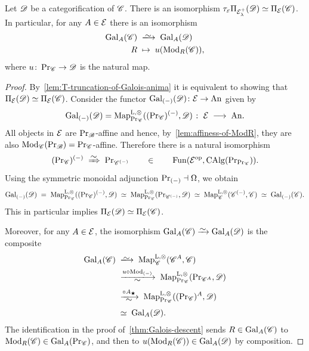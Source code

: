 \documentclass[english,svgnames,table]{article}
\begin{document}
    \begin{proposition}
    \label{prop:piT-and-categorification}
        Let $\cD$ be a categorification of $\cC$.
        There is an isomorphism $\tau_{\scriptscriptstyle\cT}{\piT[\cT^+_{\lambda}]}(\cD) \simeq \piT(\cC)$. In particular, for any $A \in \cT$ there is an isomorphism
        \begin{equation*}
            \begin{split}
                \Gal_A(\cC) & \;\isotoo\; \Gal_A(\cD) \\
                R & \;\mapsto\; u(\Mod_R(\cC)),
            \end{split}
        \end{equation*}
        where $u \colon \ModC \to \cD$ is the natural map.
    \end{proposition}
    \begin{proof}
        By~\cref{lem:T-truncation-of-Galois-anima} it is equivalent to showing that $\piT(\cD) \simeq \piT(\cC)$.
        Consider the functor $\Gal_{(-)}(\cD) \colon \cT \to \An$ given by
        \begin{equation*}
            \Gal_{(-)}(\cD) = \MapCo[\ModC]((\ModC)^{(-)}, \cD) \;\colon\; \cT \;\too\; \An.
        \end{equation*}
        All objects in $\cT$ are $\ModB$-affine and hence, by~\cref{lem:affiness-of-ModR}, they are also $\Mod_{\cC}(\ModB) = \ModC$-affine. Therefore there is a natural isomorphism
        \begin{equation*}
            (\ModC)^{(-)} \;\isoToo\; \ModC[\cC^{(-)}] \qin \Fun(\cT\op, \CAlgC[\ModC]).
        \end{equation*}
        Using the symmetric monoidal adjunction $\ModC[(-)] \dashv \Omega$, we obtain
        \begin{equation*}
            \Gal_{(-)}(\cD) \;=\; \MapCo[\ModC]((\ModC)^{(-)}, \cD) \;\simeq\; \MapCo[\ModC](\ModC[\cC^{(-)}], \cD) \;\simeq\; \MapCo(\cC^{(-)}, \cC) \;\simeq\; \Gal_{(-)}(\cC).
        \end{equation*}
        This in particular implies $\piT(\cD) \simeq \piT(\cC)$.
    
        Moreover, for any $A \in \cT$, the isomorphism $\Gal_A(\cC) \isoto \Gal_A(\cD)$ is the composite
        \begin{equation*}
            \begin{split}
                \Gal_A(\cC) 
                & \;\isotoo\; \MapCo(\cC^A, \cC) \\
                & \;\xisotoo{u \circ \Mod_{(-)}}\; \MapCo[\ModC](\ModC[\cC^A], \cD) \\
                & \;\xisotoo{\circ A_{\scriptscriptstyle\bigstar}}\; \MapCo[\ModC]((\ModC)^A, \cD) \\
                & \;\simeq\; \Gal_A(\cD).
            \end{split}
        \end{equation*}
        The identification in the proof of~\cref{thm:Galois-descent} sends $R \in \Gal_A(\cC)$ to $\Mod_R(\cC) \in \Gal_A(\ModC)$, and then to $u(\Mod_R(\cC)) \in \Gal_A(\cD)$ by composition.
    \end{proof}
\end{document}
